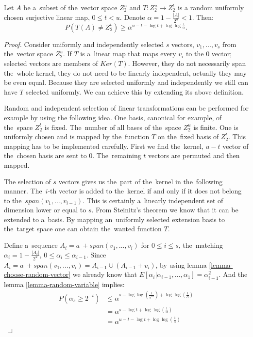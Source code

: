 \begin{theorem}
\label{theorem-linear-function-set-onto}
Let $A$ be a~subset of the~vector space $Z_2^u$ and $T: Z_2^u \rightarrow Z_2^t$ is a random uniformly chosen surjective linear map, $0 \leq t < u$. Denote $\alpha = 1 - \frac{|A|}{2^u} < 1$. Then:
\begin{displaymath}
P(T(A) \neq Z_2^t) \geq \alpha^{u - t - \log t + \log \log \frac{1}{\alpha}} \textit{.}
\end{displaymath}
\end{theorem}
\begin{proof}
Consider uniformly and independently selected $s$ vectors, $v_1, \dots, v_s$ from the~vector space $Z_2^u$. If $T$ is a~linear map that maps every $v_i$ to the $0$ vector; selected vectors are members of $Ker(T)$. However, they do not necessarily span the~whole kernel, they do not need to be linearly independent, actually they may be even equal. Because they are selected uniformly and independently we still can have $T$ selected uniformly. We can achieve this by extending its above definition. 

Random and independent selection of linear transformations can be performed for example by using the following idea. One basis, canonical for example, of the~space $Z_2^t$ is fixed. The~number of all bases of the~space $Z_2^u$ is finite. One is uniformly chosen and is mapped by the~function $T$ on the~fixed basis of $Z_2^t$. This mapping has to be implemented carefully. First we find the~kernel, $u-t$ vector of the~chosen basis are sent to $0$. The~remaining $t$ vectors are permuted and then mapped.

The selection of $s$ vectors gives us the~part of the~kernel in the~following manner. The~$i$-th vector is added to the~kernel if and only if it does not belong to the~$span(v_1, \dots, v_{i-1})$. This is certainly a~linearly independent set of dimension lower or equal to $s$. From Steinitz's theorem we know that it can be extended to a~basis. By mapping an~uniformly selected extension basis to the~target space one can obtain the~wanted function $T$.

Define a~sequence $A_i = a~+ span(v_1, \dots, v_i)$ for $0 \leq i \leq s$, the~matching $\alpha_i = 1 - \frac{|A_i|}{2^u}$, $0 \leq \alpha_i \leq \alpha_{i-1}$. Since $A_{i} = a~+ span(v_1, \dots, v_i) = A_{i-1} \cup (A_{i-1} + v_i)$, by using lemma \ref{lemma-choose-random-vector} we already know that $E[\alpha_i | \alpha_{i-1}, \dots, \alpha_1] = \alpha_{i-1}^2$. And the lemma \ref{lemma-random-variable} implies:
\begin{displaymath}
\begin{split}
P(\alpha_s \geq 2^{-t}) 
	& \leq \alpha^{s - \log \log (\frac{1}{2^{-t}}) + \log \log (\frac{1}{\alpha})} \\
	& = \alpha^{s - \log t + \log \log (\frac{1}{\alpha})} \\
	& = \alpha^{u - t - \log t + \log \log (\frac{1}{\alpha})}
\end{split}
\end{displaymath}


\end{proof}
